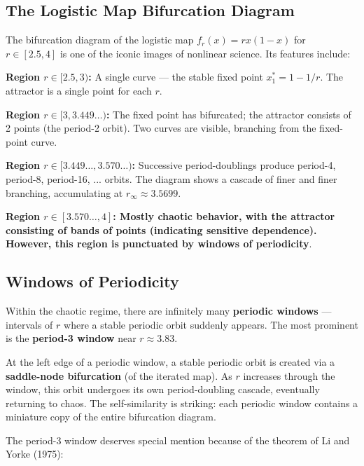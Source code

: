 \subsection{The Logistic Map Bifurcation Diagram}\label{sec:5.6.2}

The bifurcation diagram of the logistic map $f_r(x) = rx(1-x)$ for $r \in [2.5, 4]$ is one of the iconic images of nonlinear science. Its features include:

\textbf{Region $r \in [2.5, 3)$:} A single curve --- the stable fixed point $x_1^* = 1 - 1/r$. The attractor is a single point for each $r$.

\textbf{Region $r \in [3, 3.449\ldots)$:} The fixed point has bifurcated; the attractor consists of 2 points (the period-2 orbit). Two curves are visible, branching from the fixed-point curve.

\textbf{Region $r \in [3.449\ldots, 3.570\ldots)$:} Successive period-doublings produce period-4, period-8, period-16, ... orbits. The diagram shows a cascade of finer and finer branching, accumulating at $r_\infty \approx 3.5699$.

\textbf{Region $r \in [3.570\ldots, 4]$:\textbf{ Mostly chaotic behavior, with the attractor consisting of bands of points (indicating sensitive dependence). However, this region is punctuated by }windows of periodicity}.

\subsection{Windows of Periodicity}\label{sec:5.6.3}

Within the chaotic regime, there are infinitely many \textbf{periodic windows} --- intervals of $r$ where a stable periodic orbit suddenly appears. The most prominent is the \textbf{period-3 window} near $r \approx 3.83$.

At the left edge of a periodic window, a stable periodic orbit is created via a \textbf{saddle-node bifurcation} (of the iterated map). As $r$ increases through the window, this orbit undergoes its own period-doubling cascade, eventually returning to chaos. The self-similarity is striking: each periodic window contains a miniature copy of the entire bifurcation diagram.

The period-3 window deserves special mention because of the theorem of Li and Yorke (1975):

